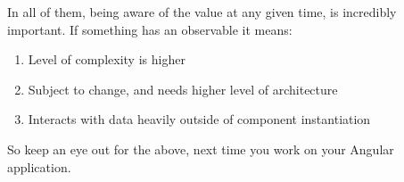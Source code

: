 In all of them, being aware of the value at any given time, is incredibly 
important. If something has an observable it means: 
\begin{enumerate}
  \item Level of complexity is higher 
  \item Subject to change, and needs higher level of architecture
  \item Interacts with data heavily outside of component instantiation
\end{enumerate}
 
So keep an eye out for the above, next time you work on your Angular 
application.
